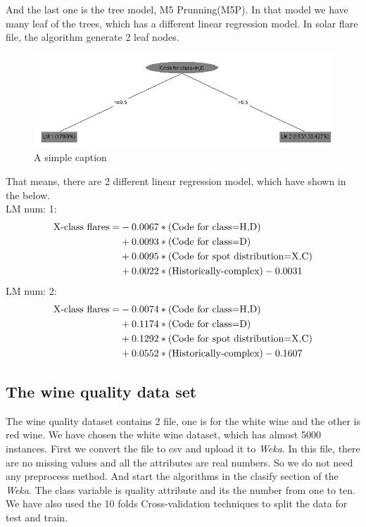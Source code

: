 \documentclass[a4paper]{article}
\begin{document}
And the last one is the tree model, M5 Prunning(M5P). In that model we have many leaf of the trees, which has a different linear regression model. In solar flare file, the algorithm generate 2 leaf nodes.

\begin{figure}[ht!]
\centering
\includegraphics[width=120mm]{tree}
\caption{A simple caption}
\label{overflow}
\end{figure}

That means, there are 2 different linear regression model, which have shown in the below.\\
LM num: 1: 
\begin{align*}
    \textnormal{X-class flares} = &-0.0067 * \textnormal{(Code for class=H,D)}\\
                                  &+ 0.0093 *\textnormal{(Code for class=D)}\\ 
                                  &+ 0.0095 *\textnormal{(Code for spot distribution=X,C)} \\
                                  &+ 0.0022 *\textnormal{(Historically-complex)} - 0.0031\\
\end{align*}
LM num: 2:
\begin{align*}
    \textnormal{X-class flares}= &-0.0074 * \textnormal{(Code for class=H,D)} \\
                                 &+ 0.1174 *\textnormal{(Code for class=D)} \\
                                 &+ 0.1292 *\textnormal{(Code for spot distribution=X,C)} \\
                                 &+ 0.0552 *\textnormal{(Historically-complex)} - 0.1607\\
\end{align*}

\subsection{The wine quality data set}

The wine quality dataset contains 2 file, one is for the white wine and the other is red wine. We have chosen the white wine dataset, which has almost 5000 instances. First we convert the file to csv and upload it to \emph{Weka}. In this file, there are no missing values and all the attributes are real numbers. So we do not need any preprocess method. And start the algorithms in the clasify section of the \emph{Weka}. The class variable is quality attribute and its the number from one to ten. We have also used the 10 folds Cross-validation techniques to split the data for test and train. 
\end{document}

